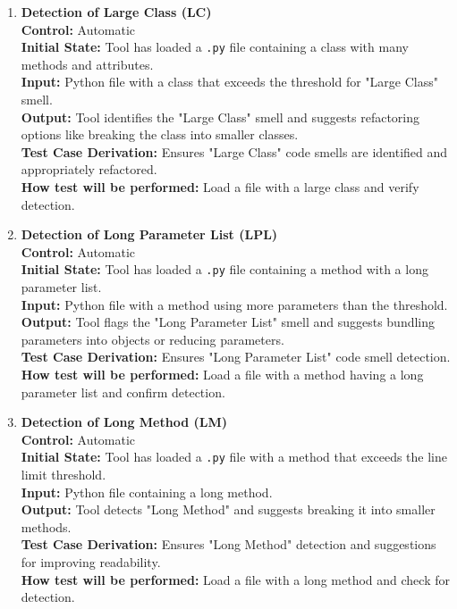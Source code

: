 \documentclass[12pt, titlepage]{article}
\begin{document}
\begin{enumerate}[label={\bf \textcolor{Maroon}{test-FR-CSD-\arabic*}}, wide=0pt, font=\itshape]
  \item \textbf{Detection of Large Class (LC)}\\[2mm]
    \textbf{Control:} Automatic \\
    \textbf{Initial State:} Tool has loaded a \texttt{.py} file containing a class with many methods and attributes.\\
    \textbf{Input:} Python file with a class that exceeds the threshold for "Large Class" smell.\\
    \textbf{Output:} Tool identifies the "Large Class" smell and suggests refactoring options like breaking the class into smaller classes.\\[2mm]
    \textbf{Test Case Derivation:} Ensures "Large Class" code smells are identified and appropriately refactored.\\[2mm]
    \textbf{How test will be performed:} Load a file with a large class and verify detection.

  \item \textbf{Detection of Long Parameter List (LPL)}\\[2mm]
    \textbf{Control:} Automatic \\       
    \textbf{Initial State:} Tool has loaded a \texttt{.py} file containing a method with a long parameter list.       \\
    \textbf{Input:} Python file with a method using more parameters than the threshold.\\
    \textbf{Output:} Tool flags the "Long Parameter List" smell and suggests bundling parameters into objects or reducing parameters.\\[2mm]
    \textbf{Test Case Derivation:} Ensures "Long Parameter List" code smell detection.\\[2mm]
    \textbf{How test will be performed:} Load a file with a method having a long parameter list and confirm detection.

  \item \textbf{Detection of Long Method (LM)}\\[2mm]
    \textbf{Control:} Automatic \\
    \textbf{Initial State:} Tool has loaded a \texttt{.py} file with a method that exceeds the line limit threshold.\\
    \textbf{Input:} Python file containing a long method.\\
    \textbf{Output:} Tool detects "Long Method" and suggests breaking it into smaller methods.\\[2mm]
    \textbf{Test Case Derivation:} Ensures "Long Method" detection and suggestions for improving readability.\\[2mm]
    \textbf{How test will be performed:} Load a file with a long method and check for detection.


\end{enumerate}
\end{document}
